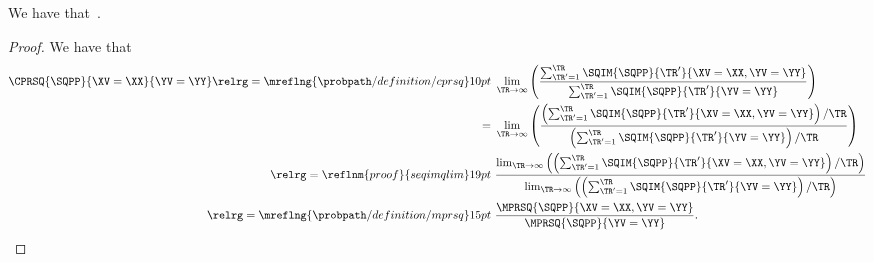 \begin{proposition}
  We have that\ \cprsqexprprop.%
\end{proposition}

\begin{proof}
  We have that
  \begin{align*}
    \CPRSQ{\SQPP}{\XV = \XX}{\YV = \YY} 
    \relrg = {\mreflng{\probpath/definition/cprsq}} 10pt \ & 
    \lim_{\TR \rightarrow \infty}
    \left(
    \frac
    {\sum_{\TR' = 1}^{\TR}\SQIM{\SQPP}{\TR'}{\XV = \XX, \YV = \YY}}
    {\sum_{\TR' = 1}^{\TR}\SQIM{\SQPP}{\TR'}{\YV = \YY}}
    \right)\\
    = \ &
    \lim_{\TR \rightarrow \infty}
    \left(
    \frac
    {\left({\sum_{\TR' = 1}^{\TR}\SQIM{\SQPP}{\TR'}{\XV = \XX, \YV = \YY}}\right)/{\TR}}
    {\left(\sum_{\TR' = 1}^{\TR}\SQIM{\SQPP}{\TR'}{\YV = \YY}\right)/\TR}
    \right)\\
    \relrg = {\reflnm{proof}{seqimqlim}} 19pt \ & 
    \frac
    {
      \lim_{\TR \rightarrow \infty}\left(
    \left({\sum_{\TR' = 1}^{\TR}\SQIM{\SQPP}{\TR'}{\XV = \XX, \YV = \YY}}\right)/{\TR}\right)}
    {
      \lim_{\TR \rightarrow \infty}\left(
    \left(\sum_{\TR' = 1}^{\TR}\SQIM{\SQPP}{\TR'}{\YV = \YY}\right)/\TR\right)}
    \\
    \relrg = {\mreflng{\probpath/definition/mprsq}} 15pt \ & 
    \frac { \MPRSQ{\SQPP}{\XV = \XX, \YV = \YY} } { \MPRSQ{\SQPP}{\YV = \YY} }.
  \end{align*}
\end{proof}
